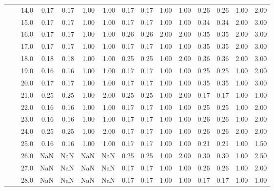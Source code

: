 \begin{tabular}{lllrrrrrrrrrrrr}
    &     & 14.0 &       0.17 &      0.17 & 1.00 &   1.00 &       0.17 &      0.17 & 1.00 &   1.00 &       0.26 &      0.26 & 1.00 &   2.00 \\
    &     & 15.0 &       0.17 &      0.17 & 1.00 &   1.00 &       0.17 &      0.17 & 1.00 &   1.00 &       0.34 &      0.34 & 2.00 &   3.00 \\
    &     & 16.0 &       0.17 &      0.17 & 1.00 &   1.00 &       0.26 &      0.26 & 2.00 &   2.00 &       0.35 &      0.35 & 2.00 &   3.00 \\
    &     & 17.0 &       0.17 &      0.17 & 1.00 &   1.00 &       0.17 &      0.17 & 1.00 &   1.00 &       0.35 &      0.35 & 2.00 &   3.00 \\
    &     & 18.0 &       0.18 &      0.18 & 1.00 &   1.00 &       0.25 &      0.25 & 1.00 &   2.00 &       0.36 &      0.36 & 2.00 &   3.00 \\
    &     & 19.0 &       0.16 &      0.16 & 1.00 &   1.00 &       0.17 &      0.17 & 1.00 &   1.00 &       0.25 &      0.25 & 1.00 &   2.00 \\
    &     & 20.0 &       0.17 &      0.17 & 1.00 &   1.00 &       0.17 &      0.17 & 1.00 &   1.00 &       0.35 &      0.35 & 1.00 &   3.00 \\
    &     & 21.0 &       0.25 &      0.25 & 1.00 &   2.00 &       0.25 &      0.25 & 1.00 &   2.00 &       0.17 &      0.17 & 1.00 &   1.00 \\
    &     & 22.0 &       0.16 &      0.16 & 1.00 &   1.00 &       0.17 &      0.17 & 1.00 &   1.00 &       0.25 &      0.25 & 1.00 &   2.00 \\
    &     & 23.0 &       0.16 &      0.16 & 1.00 &   1.00 &       0.17 &      0.17 & 1.00 &   1.00 &       0.26 &      0.26 & 1.00 &   2.00 \\
    &     & 24.0 &       0.25 &      0.25 & 1.00 &   2.00 &       0.17 &      0.17 & 1.00 &   1.00 &       0.26 &      0.26 & 2.00 &   2.00 \\
    &     & 25.0 &       0.16 &      0.16 & 1.00 &   1.00 &       0.17 &      0.17 & 1.00 &   1.00 &       0.21 &      0.21 & 1.00 &   1.50 \\
    &     & 26.0 &        NaN &       NaN &  NaN &    NaN &       0.25 &      0.25 & 1.00 &   2.00 &       0.30 &      0.30 & 1.00 &   2.50 \\
    &     & 27.0 &        NaN &       NaN &  NaN &    NaN &       0.17 &      0.17 & 1.00 &   1.00 &       0.26 &      0.26 & 1.00 &   2.00 \\
    &     & 28.0 &        NaN &       NaN &  NaN &    NaN &       0.17 &      0.17 & 1.00 &   1.00 &       0.17 &      0.17 & 1.00 &   1.00 \\

\end{tabular}
